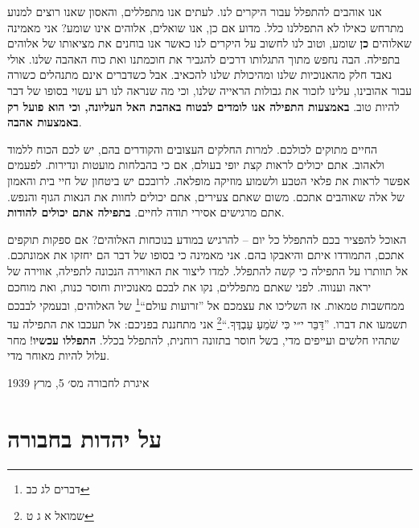 \documentclass[14pt, article, extrafontsizes, twopage, a4paper]{memoir}
\newcommand{\attr}[1]{
{\raggedright\smaller#1}
}
\begin{document}
אנו אוהבים להתפלל עבור היקרים לנו. לעתים אנו מתפללים, והאסון שאנו רוצים למנוע מתרחש כאילו לא התפללנו כלל. מדוע אם כן, אנו שואלים, אלוהים אינו שומע? אני מאמינה שאלוהים \textbf {כן} שומע, וטוב לנו לחשוב על היקרים לנו כאשר אנו בוחנים את מציאותו של אלוהים בתפילה. הבה נחפש מתוך התגלותו דרכים להגביר את חוכמתנו ואת כוח האהבה שלנו. אולי נאבד חלק מהאנוכיות שלנו ומהיכולת שלנו להכאיב. אבל כשדברים אינם מתנהלים כשורה עבור אהובינו, עלינו לזכור את גבולות הראייה שלנו, וכי מה שנראה לנו רע עשוי בסופו של דבר להיות טוב. \textbf{באמצעות התפילה אנו לומדים לבטוח באהבת האל העליונה, וכי הוא פועל רק באמצעות אהבה}.

החיים מתוקים לכולכם. למרות החלקים העצובים והקודרים בהם, יש לכם הכוח ללמוד ולאהוב. אתם יכולים לראות קצת יופי בעולם, אם כי בהבלחות מועטות ונדירות. לפעמים אפשר לראות את פלאי הטבע ולשמוע מוזיקה מופלאה. לרובכם יש ביטחון של חיי בית והאמון של אלה שאוהבים אתכם. משום שאתם צעירים, אתם יכולים לחוות את הנאות הגוף והנפש. אתם מרגישים אסירי תודה לחיים. \textbf{בתפילה אתם יכולים להודות}.

האוכל להפציר בכם להתפלל כל יום -- להרגיש במודע בנוכחות האלוהים? אם ספקות תוקפים אתכם, התמודדו איתם והיאבקו בהם. אני מאמינה כי בסופו של דבר הם יחזקו את אמונתכם. אל תוותרו על התפילה כי קשה להתפלל. למדו ליצור את האווירה הנכונה לתפילה, אווירה של יראה וענווה. לפני שאתם מתפללים, נקו את לבכם מאנוכיות וחוסר כנות, ואת מוחכם ממחשבות טמאות. אז השליכו את עצמכם אל ”זרועות עולם“\footnote{דברים לג כב} של האלוהים, ובעמקי לבבכם תשמעו את דברו. ”דַּבֵּר י״י כִּי שֹׁמֵעַ עַבְדֶּךָ.“\footnote{שמואל א ג ט} אני מתחננת בפניכם: אל תעכבו את התפילה עד שתהיו חלשים ועייפים מדי, בשל חוסר בתזונה רוחנית, להתפלל בכלל. \textbf{התפללו עכשיו}! מחר עלול להיות מאוחר מדי.

\attr{איגרת לחבורה מס׳ 5, מרץ 1939}

\chapter{על יהדות בחבורה}
\end{document}
